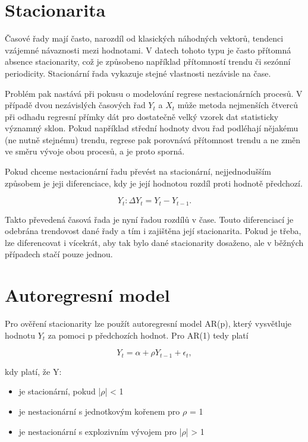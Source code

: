 \documentclass[thesis=M,czech]{FITthesis}[2022/10/08]
\begin{document}
\section{Stacionarita}

Časové řady mají často, narozdíl od klasických náhodných vektorů, tendenci vzájemné návaznosti mezi hodnotami. V datech tohoto typu je často přítomná absence stacionarity, což je způsobeno například přítomností trendu či sezónní periodicity. Stacionární řada vykazuje stejné vlastnosti nezávisle na čase.

Problém pak nastává při pokusu o modelování regrese nestacionárních procesů. V případě dvou nezávislých časových řad $Y_t$ a $X_t$ může metoda nejmenších čtverců při odhadu regresní přímky dát pro dostatečně velký vzorek dat statisticky významný sklon. Pokud například střední hodnoty dvou řad podléhají nějakému (ne nutně stejnému) trendu, regrese pak porovnává přítomnost trendu a ne změn ve směru vývoje obou procesů, a je proto sporná. 

Pokud chceme nestacionární řadu převést na stacionární, nejjednodušším způsobem je jeji diferenciace, kdy je její hodnotou rozdíl proti hodnotě předchozí.

\[ Y_t : \Delta Y_t = Y_t - Y_{t-1}.\] 

Takto převedená časová řada je nyní řadou rozdílů v čase. Touto diferenciací je odebrána trendovost dané řady a tím i zajištěna její stacionarita. Pokud je třeba, lze diferencovat i vícekrát, aby tak bylo dané stacionarity dosaženo, ale v běžných případech stačí pouze jednou.\cite{krivy}

\section{Autoregresní model}

Pro ověření stacionarity lze použít autoregresní model AR(p), který vysvětluje hodnotu $Y_t$ za pomoci p předchozích hodnot. Pro AR(1) tedy platí \cite{AJCR}  

\[Y_t = \alpha + \rho Y_{t-1} + \epsilon_t,\]

kdy platí, že Y: 
\begin{itemize}
    \item je stacionární, pokud |$\rho$| < 1
    \item je nestacionární s jednotkovým kořenem pro  $\rho$ = 1
    \item je nestacionární s explozivním vývojem pro |$\rho$| > 1
\end{itemize}
 
\end{document}
